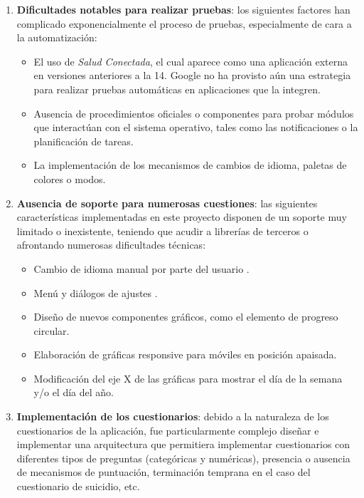 \begin{enumerate}
        \item \textbf{Dificultades notables para realizar pruebas}: los siguientes factores han complicado exponencialmente el proceso de pruebas, especialmente de cara a la automatización:
    
        \begin{itemize}
            \item El uso de \textit{Salud Conectada}, el cual aparece como una aplicación externa en versiones anteriores a la 14. Google no ha provisto aún una estrategia para realizar pruebas automáticas en aplicaciones que la integren.
            \item Ausencia de procedimientos oficiales o componentes para probar módulos que interactúan con el sistema operativo, tales como las notificaciones o la planificación de tareas.
            \item La implementación de los mecanismos de cambios de idioma, paletas de colores o modos.
        \end{itemize}
    
        \item \textbf{Ausencia de soporte para numerosas cuestiones}: las siguientes características implementadas en este proyecto disponen de un soporte muy limitado o inexistente, teniendo que acudir a librerías de terceros o afrontando numerosas dificultades técnicas:
            \begin{itemize}
                \item Cambio de idioma manual por parte del usuario \cite{berezanskyi_how_2020}.
                \item Menú y diálogos de ajustes \cite{borras_paronella_alormacompose-settings_nodate}.
                \item Diseño de nuevos componentes gráficos, como el elemento de progreso circular.
                \item Elaboración de gráficas \gls{responsive} para móviles en posición apaisada.
                \item Modificación del eje X de las gráficas para mostrar el día de la semana y/o el día del año.
            \end{itemize}
        \item \textbf{Implementación de los cuestionarios}: debido a la naturaleza de los cuestionarios de la aplicación, fue particularmente complejo diseñar e implementar una arquitectura que permitiera implementar cuestionarios con diferentes tipos de preguntas (categóricas y numéricas), presencia o ausencia de mecanismos de puntuación, terminación temprana en el caso del cuestionario de suicidio, etc.
    \end{enumerate}
